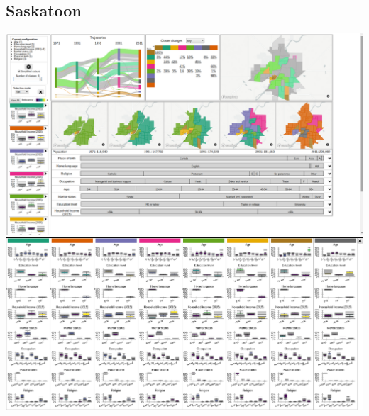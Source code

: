 \documentclass[a4paper]{article}
\begin{document}
\subsection{Saskatoon}
\begin{center}
	\includegraphics[width=\linewidth]{7a.png}
	\includegraphics[width=\linewidth]{7b.png}
\end{center}
\end{document}
